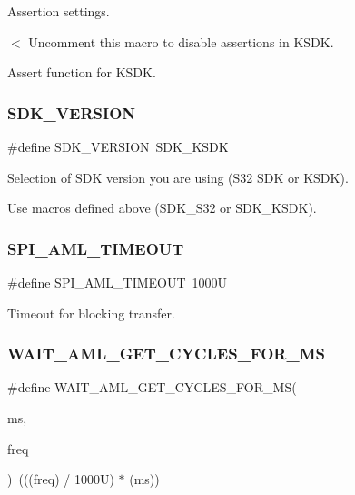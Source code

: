 Assertion settings. 

$<$ Uncomment this macro to disable assertions in K\+S\+DK.

Assert function for K\+S\+DK. \mbox{\label{group__macro__group_ga320c0ce8fc9d4967696a15bfe0c17129}} 
\subsubsection{\texorpdfstring{SDK\_VERSION}{SDK\_VERSION}}
{\footnotesize\ttfamily \#define S\+D\+K\+\_\+\+V\+E\+R\+S\+I\+ON~S\+D\+K\+\_\+\+K\+S\+DK}



Selection of S\+DK version you are using (S32 S\+DK or K\+S\+DK). 

Use macros defined above (S\+D\+K\+\_\+\+S32 or S\+D\+K\+\_\+\+K\+S\+DK). \mbox{\label{group__macro__group_ga8e71a8b01608ee3dcdca398b049e6fc6}} 
\subsubsection{\texorpdfstring{SPI\_AML\_TIMEOUT}{SPI\_AML\_TIMEOUT}}
{\footnotesize\ttfamily \#define S\+P\+I\+\_\+\+A\+M\+L\+\_\+\+T\+I\+M\+E\+O\+UT~1000U}

Timeout for blocking transfer. \mbox{\label{group__macro__group_ga16504c90d2a4d3b38e4a1c2e6d7836bf}} 
\subsubsection{\texorpdfstring{WAIT\_AML\_GET\_CYCLES\_FOR\_MS}{WAIT\_AML\_GET\_CYCLES\_FOR\_MS}}
{\footnotesize\ttfamily \#define W\+A\+I\+T\+\_\+\+A\+M\+L\+\_\+\+G\+E\+T\+\_\+\+C\+Y\+C\+L\+E\+S\+\_\+\+F\+O\+R\+\_\+\+MS(\begin{DoxyParamCaption}\item[{}]{ms,  }\item[{}]{freq }\end{DoxyParamCaption})~(((freq) / 1000\+U) $\ast$ (ms))}

